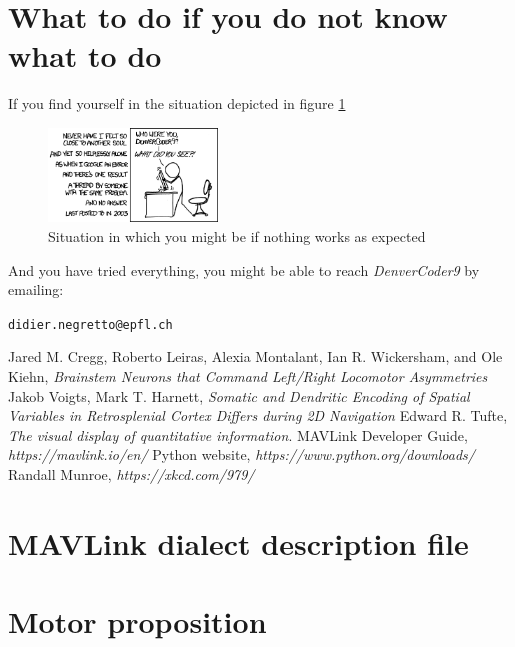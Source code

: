 \documentclass[12pt,a4paper, twoside]{article}
\begin{document}
\section{What to do if you do not know what to do}
If you find yourself in the situation depicted in figure \ref{fig:xkcd}
\begin{figure}[H]
	\centering
	\includegraphics[width=0.4\textwidth]{fig/wisdom_of_the_ancients}
	\caption{Situation in which you might be if nothing works as expected \cite{xkcd}}\label{fig:xkcd}
\end{figure}
And you have tried everything, you might be able to reach \textit{DenverCoder9} by emailing:\\
\vspace{-0.5cm}
\begin{center}
	\texttt{didier.negretto@epfl.ch}
\end{center}




\newpage
\lhead{ }
\begin{thebibliography}{100}
	
	Jared M. Cregg, Roberto Leiras, Alexia Montalant, Ian R. Wickersham, and Ole Kiehn, \textit{Brainstem Neurons that Command Left/Right Locomotor Asymmetries} 
	 Jakob Voigts, Mark T. Harnett, \textit{Somatic and Dendritic Encoding of Spatial Variables in Retrosplenial Cortex Differs during 2D Navigation}
	 Edward R. Tufte, \textit{The visual display of quantitative information}.
	 MAVLink Developer Guide, \textit{https://mavlink.io/en/}
	 Python website, \textit{https://www.python.org/downloads/}
	 Randall Munroe, \textit{https://xkcd.com/979/}

	
\end{thebibliography}

\listoffigures
\listoftables
\newpage
\appendix
\section{MAVLink dialect description file}\label{app:mavlink}

\section{Motor proposition}\label{app:motor}

\end{document}

